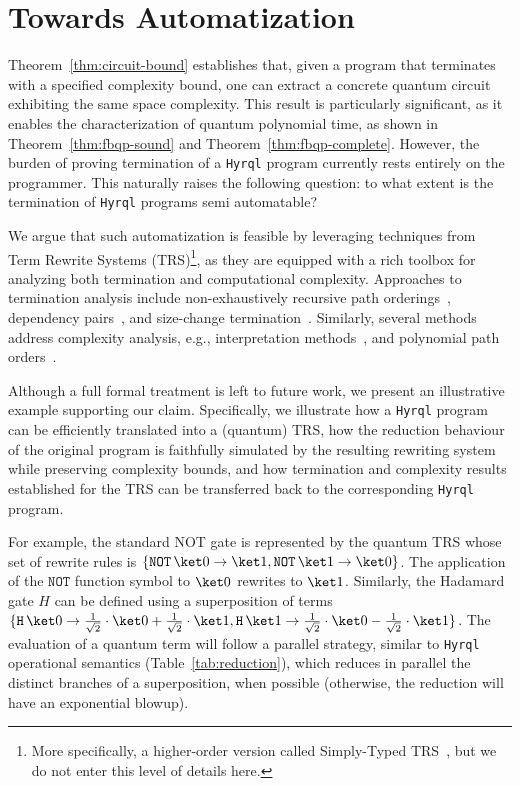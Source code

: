 \documentclass[10pt,a4paper]{article}
\newcommand{\zket}{\ket 0}
\newcommand{\oket}{\ket 1}
\newcommand{\hyrql}{{{\tt{Hyrql}}}}
\begin{document}
\section{Towards Automatization}
\label{sec:automatization}

Theorem~\ref{thm:circuit-bound} establishes that, given a program
that terminates with a specified complexity bound, one can extract a
concrete quantum circuit exhibiting the same space complexity. This result
is particularly significant, as it enables the characterization of
 quantum polynomial time, as shown in Theorem~\ref{thm:fbqp-sound} and
 Theorem~\ref{thm:fbqp-complete}. However, the burden of proving termination of
 a \hyrql{} program currently rests entirely on the programmer.
This naturally raises the following question: to what
extent is the termination of \hyrql{} programs semi automatable?

We argue that such automatization is feasible by leveraging techniques
from Term Rewrite Systems (TRS)\footnote{More specifically, a higher-order version
called Simply-Typed TRS~\cite{Yam01}, but we do not enter this level of details
here.}, as they
are equipped with a rich toolbox for analyzing both termination and
computational complexity. Approaches to termination analysis include
non-exhaustively recursive path
orderings~\cite{Der82,Der87}, dependency pairs~\cite{AG00}, and
size-change termination~\cite{LJBA01}. Similarly, several methods
address complexity analysis, e.g.,
interpretation methods~\cite{BMM11,MP09,BDL16}, and polynomial path
orders~\cite{Moser09,AM09}.

Although a full formal treatment is left to future work, we
present an illustrative example supporting our claim. Specifically, we
illustrate how a \hyrql{} program can be efficiently translated into a (quantum) TRS,
how the reduction behaviour of the original program is faithfully
simulated by the resulting rewriting system while preserving
complexity bounds, and how termination and complexity results
established for the TRS can be transferred back to the corresponding
\hyrql{} program.


For example, the standard NOT gate is represented by the quantum TRS whose set
of rewrite rules is $ \{\mathtt{NOT}\,\zket \to \oket, \mathtt{NOT}\,\oket \to
\zket\}$. The application of the $\mathtt{NOT}$ function symbol to $\zket$
rewrites to $\oket$. Similarly, the Hadamard gate $H$ can be defined using a
superposition of terms $ \{\mathtt{H}\,\zket \to \frac{1}{\sqrt 2} \cdot \zket
+ \frac{1}{\sqrt 2} \cdot \oket, \mathtt{H}\,\oket \to  \frac{1}{\sqrt 2} \cdot
\zket - \frac{1}{\sqrt 2} \cdot \oket\}$. The evaluation of a quantum term will
follow a parallel strategy, similar to \hyrql{} operational semantics
(Table~\ref{tab:reduction}), which reduces in parallel the distinct branches of
a superposition, when possible (otherwise, the reduction will have an
exponential blowup).
\end{document}
